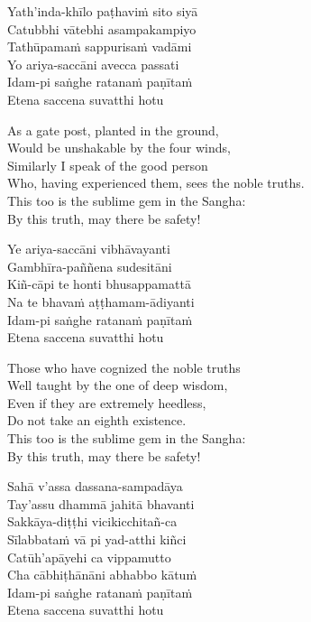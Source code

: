 Yath’inda-khīlo paṭhaviṁ sito siyā\\
Catubbhi vātebhi asampakampiyo\\
Tathūpamaṁ sappurisaṁ vadāmi\\
Yo ariya-saccāni avecca passati\\
Idam-pi saṅghe ratanaṁ paṇītaṁ\\
Etena saccena suvatthi hotu

\begin{english}
  As a gate post, planted in the ground,\\
  Would be unshakable by the four winds,\\
  Similarly I speak of the good person\\
  Who, having experienced them, sees the noble truths.\\
  This too is the sublime gem in the Sangha:\\
  By this truth, may there be safety!
\end{english}

Ye ariya-saccāni vibhāvayanti\\
Gambhīra-paññena sudesitāni\\
Kiñ-cāpi te honti bhusappamattā\\
Na te bhavaṁ aṭṭhamam-ādiyanti\\
Idam-pi saṅghe ratanaṁ paṇītaṁ\\
Etena saccena suvatthi hotu

\begin{english}
  Those who have cognized the noble truths\\
  Well taught by the one of deep wisdom,\\
  Even if they are extremely heedless,\\
  Do not take an eighth existence.\\
  This too is the sublime gem in the Sangha:\\
  By this truth, may there be safety!
\end{english}

Sahā v’assa dassana-sampadāya\\
Tay’assu dhammā jahitā bhavanti\\
Sakkāya-diṭṭhi vicikicchitañ-ca\\
Sīlabbataṁ vā pi yad-atthi kiñci\\
Catūh’apāyehi ca vippamutto\\
Cha cābhiṭhānāni abhabbo kātuṁ\\
Idam-pi saṅghe ratanaṁ paṇītaṁ\\
Etena saccena suvatthi hotu

